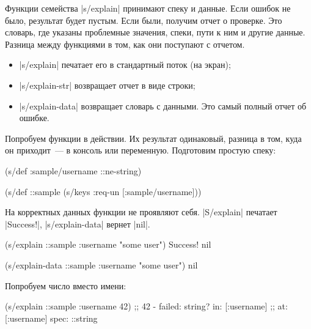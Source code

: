 Функции семейства \spverb|s/explain| принимают спеку и данные. Если ошибок не
было, результат будет пустым. Если были, получим отчет о проверке. Это словарь,
где указаны проблемные значения, спеки, пути к ним и другие данные. Разница
между функциями в том, как они поступают с отчетом.

\begin{itemize}

\item
  \spverb|s/explain| печатает его в стандартный поток (на экран);

\item
  \spverb|s/explain-str| возвращает отчет в виде строки;

\item
  \spverb|s/explain-data| возвращает словарь с данными. Это самый полный отчет
  об ошибке.

\end{itemize}

Попробуем функции в действии. Их результат одинаковый, разница в том, куда он
приходит~--- в консоль или переменную. Подготовим простую спеку:

\begin{english}
  \begin{clojure}
(s/def :sample/username ::ne-string)

(s/def ::sample
  (s/keys :req-un [:sample/username]))
  \end{clojure}
\end{english}

На корректных данных функции не проявляют себя. \spverb|S/explain| печатает
\spverb|Success!|, \spverb|s/explain-data| вернет \spverb|nil|.

\begin{english}
  \begin{clojure}
(s/explain ::sample {:username "some user"})
Success!
nil

(s/explain-data ::sample {:username "some user"})
nil
  \end{clojure}
\end{english}

Попробуем число вместо имени:

\begin{english}
  \begin{clojure}
(s/explain ::sample {:username 42})
;; 42 - failed: string? in: [:username]
;; at: [:username] spec: ::string
  \end{clojure}
\end{english}

